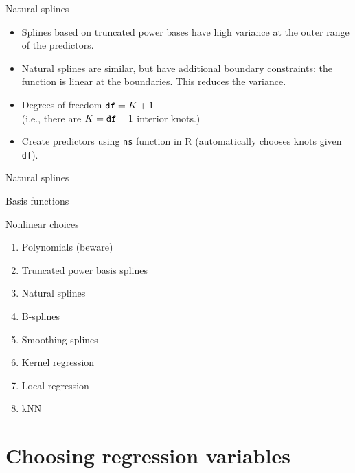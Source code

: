 \documentclass[14pt]{beamer}
\begin{document}
\begin{frame}[fragile]{Natural splines}

\begin{itemize}
\item 
Splines based on truncated power bases have high variance at the outer range of the predictors.
\item Natural splines are similar, but have additional \alert{boundary constraints}: the function is linear at the boundaries. This reduces the variance.

\item Degrees of freedom $\verb|df|=K+1$\\ (i.e., there are $K=\verb|df|-1$ interior knots.)

\item Create predictors using \verb|ns| function in R (automatically chooses knots given \verb|df|).


\end{itemize}

\end{frame}

\begin{frame}{Natural splines}

\end{frame}

\begin{frame}{Basis functions}
\end{frame}

\begin{frame}{Nonlinear choices}
\begin{enumerate}
\item Polynomials (beware)
\item Truncated power basis splines
\item Natural splines
\item B-splines
\item Smoothing splines
\item Kernel regression
\item Local regression
\item kNN
\end{enumerate}
\end{frame}



\section{Choosing regression variables}
\end{document}
